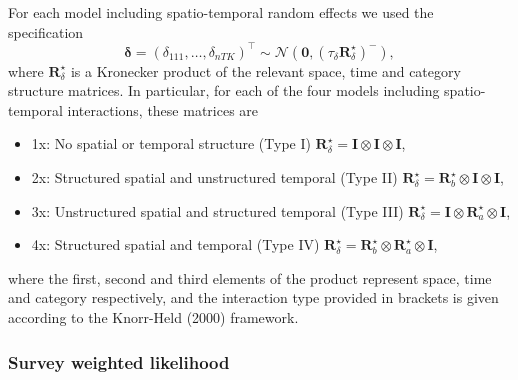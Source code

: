 \documentclass[
]{article}
\begin{document}
For each model including spatio-temporal random effects we used the
specification \begin{equation}
    \bm{\delta} = (\delta_{111}, \ldots, \delta_{nTK})^\top \sim \mathcal{N}(\mathbf{0}, (\tau_\delta \mathbf{R}^\star_\delta)^{-}),
\end{equation} where \(\mathbf{R}^\star_\delta\) is a Kronecker product
of the relevant space, time and category structure matrices. In
particular, for each of the four models including spatio-temporal
interactions, these matrices are

\begin{itemize}
\item
1x: No spatial or temporal structure (Type I) $\mathbf{R}^\star_\delta = \mathbf{I} \otimes \mathbf{I} \otimes \mathbf{I}$,
\item
2x: Structured spatial and unstructured temporal (Type II) $\mathbf{R}^\star_\delta = \mathbf{R}^\star_b \otimes \mathbf{I} \otimes \mathbf{I}$,
\item
3x: Unstructured spatial and structured temporal (Type III) $\mathbf{R}^\star_\delta = \mathbf{I} \otimes \mathbf{R}^\star_a \otimes \mathbf{I}$,
\item
4x: Structured spatial and temporal (Type IV) $\mathbf{R}^\star_\delta = \mathbf{R}^\star_b \otimes \mathbf{R}^\star_a \otimes \mathbf{I}$,
\\
\end{itemize}

where the first, second and third elements of the product represent
space, time and category respectively, and the interaction type provided
in brackets is given according to the Knorr-Held (2000) framework.

\hypertarget{survey-weighted-likelihood}{%
\subsubsection{Survey weighted
likelihood}\label{survey-weighted-likelihood}}
\end{document}
